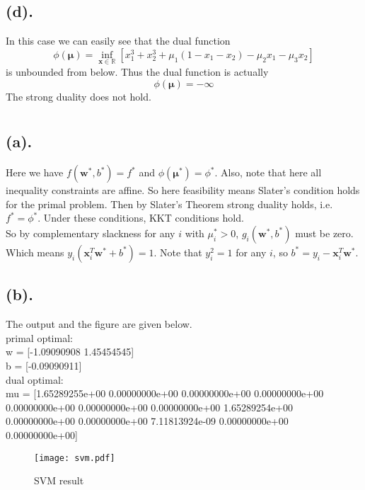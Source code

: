 \documentclass[12pt,letterpaper]{article}
\begin{document}
\subsection*{(d).}
In this case we can easily see that the dual function $$\phi(\boldsymbol{\mu})=\inf_{\boldsymbol{x}\in\mathbb{R}}[x_1^3+x_2^3+\mu_1(1-x_1-x_2)-\mu_2x_1-\mu_3x_2]
$$
is unbounded from below. Thus the dual function is actually $$
\phi(\boldsymbol{\mu})=-\infty$$
The strong duality does not hold.
\section{}
\subsection*{(a).}
Here we have $f(\boldsymbol{w}^*,b^*)=f^*$ and $\phi(\boldsymbol{\mu}^*)=\phi^*$. Also, note that here all inequality constraints are affine. So here feasibility means Slater's condition holds for the primal problem. Then by Slater's Theorem strong duality holds, i.e. $f^*=\phi^*$. Under these conditions, KKT conditions hold.\\
So by complementary slackness for any $i$ with $\mu_i^*>0$, $g_i(\boldsymbol{w}^*,b^*)$ must be zero. Which means $y_i(\boldsymbol{x}_i^T\boldsymbol{w}^*+b^*)=1$. Note that $y_i^2=1$ for any $i$, so $b^*=y_i-\boldsymbol{x}_i^T\boldsymbol{w}^*$. 
\subsection*{(b).}
The output and the figure are given below.\\
primal optimal:\\
 w = [-1.09090908  1.45454545]\\
 b = [-0.09090911]\\

dual optimal:\\
 mu = [1.65289255e+00 0.00000000e+00 0.00000000e+00 0.00000000e+00
 0.00000000e+00 0.00000000e+00 0.00000000e+00 1.65289254e+00
 0.00000000e+00 0.00000000e+00 7.11813924e-09 0.00000000e+00
 0.00000000e+00]\\

\begin{figure}[h]
\centering
\texttt{[image: svm.pdf]}
\caption{SVM result}
\label{trandgap1a}
\end{figure}
\end{document}
